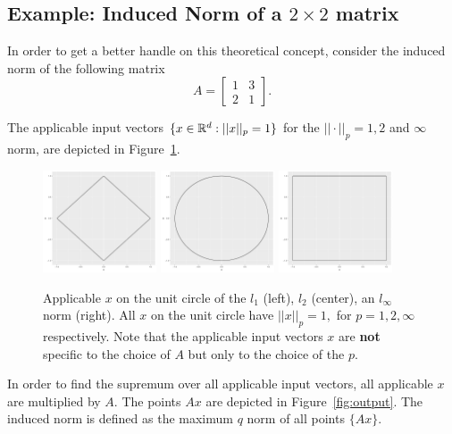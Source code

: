\documentclass{article}
\begin{document}
\subsection{Example: Induced Norm of a $2 \times 2$ matrix}
In order to get a better handle on this theoretical concept, consider the induced norm of the following matrix 
$$A = 
\begin{bmatrix}
1 & 3 \\
2 & 1
\end{bmatrix}.$$

The applicable input vectors $\{x \in \mathbb{R}^d: ||x||_p = 1\}$ for the $||\cdot||_p = 1, 2$ and $\infty$ norm, are depicted in Figure~\ref{fig:input}.

\begin{figure}[ht]
    \centering
    \includegraphics[width=0.3\textwidth]{unit_circle_1.pdf}
    \includegraphics[width=0.3\textwidth]{unit_circle_2.pdf}
    \includegraphics[width=0.3\textwidth]{unit_circle_inf.pdf}
    \caption{Applicable $x$ on the unit circle of the $l_1$ (left), $l_2$ (center), an $l_\infty$ norm (right). All $x$ on the unit circle have $||x||_p = 1,$ for $p = 1, 2, \infty$ respectively. Note that the applicable input vectors $x$ are \textbf{not} specific to the choice of $A$ but only to the choice of the $p$.}
    \label{fig:input}
\end{figure}


In order to find the supremum over all applicable input vectors, all applicable $x$ are  multiplied by $A$. The points $Ax$ are depicted in Figure~\ref{fig:output}. The induced norm is defined as the maximum $q$ norm of all points $\{Ax\}$.
\end{document}
